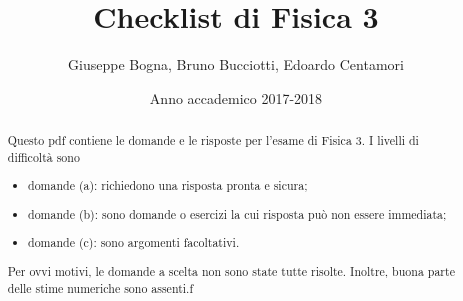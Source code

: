 \documentclass{article}
\title{Checklist di Fisica 3}
\author{Giuseppe Bogna, Bruno Bucciotti, Edoardo Centamori}
\date{Anno accademico 2017-2018}
\renewcommand{\a}{(a)}
\renewcommand{\b}{(b)}
\renewcommand{\c}{(c)}
\begin{document}
	\maketitle
	
	\begin{abstract}
		Questo pdf contiene le domande e le risposte per l'esame di Fisica 3. I livelli di difficoltà sono\begin{itemize}
			\item domande \a : richiedono una risposta pronta e sicura;
			\item domande \b : sono domande o esercizi la cui risposta può non essere immediata;
			\item domande \c : sono argomenti facoltativi.
		\end{itemize}
		Per ovvi motivi, le domande a scelta non sono state tutte risolte. Inoltre, buona parte delle stime numeriche sono assenti.f
	\end{abstract}

\tableofcontents
\end{document}
